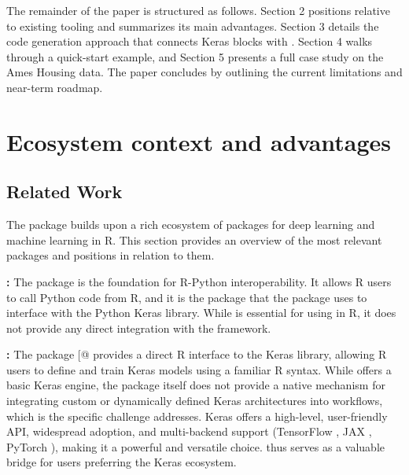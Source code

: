 The remainder of the paper is structured as follows. Section 2 positions  relative to existing tooling and summarizes its main advantages. Section 3 details the code generation approach that connects Keras blocks with . Section 4 walks through a quick-start example, and Section 5 presents a full case study on the Ames Housing data. The paper concludes by outlining the current limitations and near-term roadmap.

\section{Ecosystem context and advantages}\label{ecosystem-context-and-advantages}

\subsection{Related Work}\label{related-work}

The  package builds upon a rich ecosystem of packages for deep learning and machine learning in R. This section provides an overview of the most relevant packages and positions  in relation to them.

\textbf{:} The  package \citep{reticulate} is the foundation for R-Python interoperability. It allows R users to call Python code from R, and it is the package that the  package uses to interface with the Python Keras library. While  is essential for using  in R, it does not provide any direct integration with the  framework.

\textbf{:} The  package {[}@\CRANpkg{keras3}{]} provides a direct R interface to the Keras library, allowing R users to define and train Keras models using a familiar R syntax. While  offers a basic Keras engine, the  package itself does not provide a native mechanism for integrating custom or dynamically defined Keras architectures into  workflows, which is the specific challenge  addresses. Keras offers a high-level, user-friendly API, widespread adoption, and multi-backend support (TensorFlow \citep{tensorflow2015-whitepaper}, JAX \citep{jax2018github}, PyTorch \citep{NEURIPS2019_9015}), making it a powerful and versatile choice.  thus serves as a valuable bridge for users preferring the Keras ecosystem.

